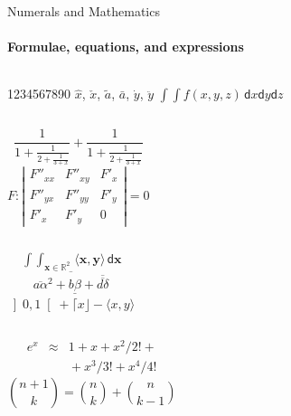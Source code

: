 \documentclass{beamer}
\begin{document}
    \begin{frame}[label=math]{Numerals and Mathematics}
      \framesubtitle{Formulae, equations, and expressions}
      \begin{columns}[onlytextwidth]
          1234567890
          $\hat{x}$, $\check{x}$, $\tilde{a}$,
          $\bar{a}$, $\dot{y}$, $\ddot{y}$
          $\int \!\! \int f(x,y,z)\,\mathsf{d}x\mathsf{d}y\mathsf{d}z$
      \end{columns}
      \begin{columns}[onlytextwidth]
          $$\frac{1}{\displaystyle 1+
            \frac{1}{\displaystyle 2+
            \frac{1}{\displaystyle 3+x}}} +
            \frac{1}{1+\frac{1}{2+\frac{1}{3+x}}}$$
          $$F:\left| \begin{array}{ccc}
          F''_{xx} & F''_{xy} &  F'_x \\
          F''_{yx} & F''_{yy} &  F'_y \\
          F'_x     & F'_y     & 0
          \end{array}\right| = 0$$
      \end{columns}
      \begin{columns}[onlytextwidth]
          $$\mathop{\int \!\!\! \int}_{\mathbf{x} \in \mathds{R}^2}
          \! \langle \mathbf{x},\mathbf{y}\rangle\,\mathsf{d}\mathbf{x}$$
          $$\overline{\overline{a\alpha}^2+\underline{b\beta}
           +\overline{\overline{d\delta}}}$$
          $\left] 0,1\right[ + \lceil x \rfloor - \langle x,y\rangle$
      \end{columns}
      \begin{columns}[onlytextwidth]
          \begin{eqnarray*}
           e^x &\approx& 1+x+x^2/2! + \\
             && {}+x^3/3! + x^4/4!
          \end{eqnarray*}
          $${n+1\choose k} = {n\choose k} + {n \choose k-1}$$
      \end{columns}
    \end{frame}
\end{document}
